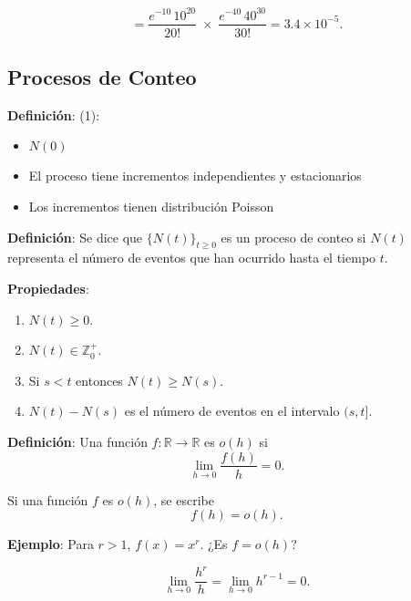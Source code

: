 \documentclass[12pt,a4paper]{article}
\newcommand{\definicion}[1]{%
\begin{definicionbox}
\textbf{Definición}: #1
\end{definicionbox}
}
\begin{document}
\begin{equation*}
= \frac{e^{-10}\,10^{20}}{20!} \; \times \; \frac{e^{-40}\,40^{30}}{30!}
= 3.4 \times 10^{-5}.
\end{equation*}

\subsection{Procesos de Conteo}

\definicion{(1):
\begin{itemize}
    \item $N(0)$
    \item El proceso tiene incrementos independientes y estacionarios
    \item Los incrementos tienen distribución Poisson
\end{itemize}}

\definicion{Se dice que $\{N(t)\}_{t \geq 0}$ es un proceso de conteo si $N(t)$ representa el número de eventos que han ocurrido hasta el tiempo $t$.}

\textbf{Propiedades}:

\begin{enumerate}
    \item $N(t) \geq 0$.
    \item $N(t) \in \mathbb{Z}_{0}^{+}$.
    \item Si $s < t$ entonces $N(t) \geq N(s)$.
    \item $N(t) - N(s)$ es el número de eventos en el intervalo $(s,t]$.
\end{enumerate}

\definicion{Una función $f : \mathbb{R} \to \mathbb{R}$ es $o(h)$ si 
\begin{equation*}
\lim_{h \to 0} \frac{f(h)}{h} = 0.
\end{equation*}}

Si una función $f$ es $o(h)$, se escribe
\begin{equation*}
f(h) = o(h).
\end{equation*}

\textbf{Ejemplo}: Para $r > 1$, $f(x) = x^r$.  
¿Es $f = o(h)$?

\begin{equation*}
\lim_{h \to 0} \frac{h^r}{h} = \lim_{h \to 0} h^{r-1} = 0.
\end{equation*}

\begin{center}
\end{center}
\end{document}
